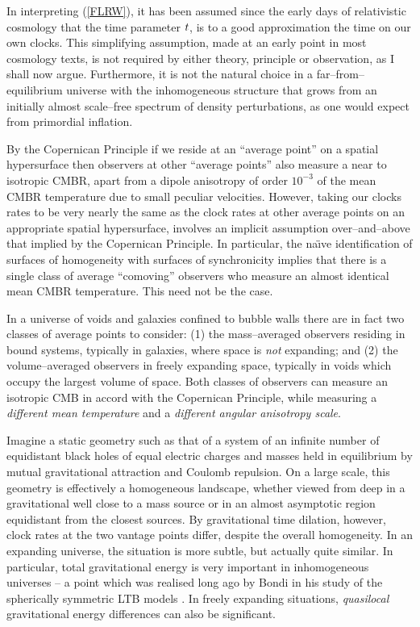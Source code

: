 \documentclass[12pt]{article}
\begin{document}
In interpreting (\ref{FLRW}), it has been assumed since the early days of
relativistic cosmology that the time parameter $t$, is to a good
approximation the time on our own clocks. This simplifying assumption, made
at an early point in most cosmology texts, is not required by either theory,
principle or observation, as I shall now argue. Furthermore, it is not the
natural choice in a far--from--equilibrium universe with the inhomogeneous
structure that grows from an initially almost scale--free spectrum of
density perturbations, as one would expect from primordial inflation.

By the Copernican Principle if we reside at an ``average point'' on
a spatial hypersurface then observers at other ``average points''
also measure a near to isotropic CMBR, apart from a dipole anisotropy
of order $10^{-3}$ of the mean CMBR temperature due to small peculiar
velocities. However, taking our
clocks rates to be very nearly the same as the clock rates at other
average points on an appropriate spatial hypersurface,
involves an implicit assumption over--and--above that implied by
the Copernican Principle. In particular, the na\"{\i}ve identification
of surfaces of homogeneity with surfaces of synchronicity implies that there
is a single class of average ``comoving'' observers who measure an almost
identical mean CMBR temperature. This need not be the case.

In a universe of voids and galaxies confined to bubble walls there are in
fact two classes of average points to consider: (1) the mass--averaged
observers residing in bound systems, typically in galaxies, where space is
{\em not} expanding; and (2) the volume--averaged observers in freely
expanding space, typically in voids which occupy the largest volume of space.
Both classes of observers can measure an isotropic CMB in accord with the
Copernican Principle, while measuring a {\em different mean temperature}
and a {\em different angular anisotropy scale}.

Imagine a static geometry such as that of a system of an infinite number of
equidistant black holes of equal electric charges and masses held in
equilibrium by mutual gravitational attraction and Coulomb repulsion. On a
large scale, this geometry is effectively a homogeneous landscape, whether
viewed from deep in a gravitational well close to a mass source or in an
almost asymptotic region equidistant from the closest sources. By
gravitational time dilation, however, clock rates at the two vantage points
differ, despite the overall homogeneity. In an expanding universe, the
situation is more subtle, but actually quite similar. In particular, total
gravitational energy is very important in inhomogeneous universes -- a point
which was realised long ago by Bondi \cite{Bondi} in his study of the
spherically symmetric LTB models \cite{LT}.
In freely expanding situations, {\em quasilocal}
gravitational energy differences can also be significant.
\end{document}
